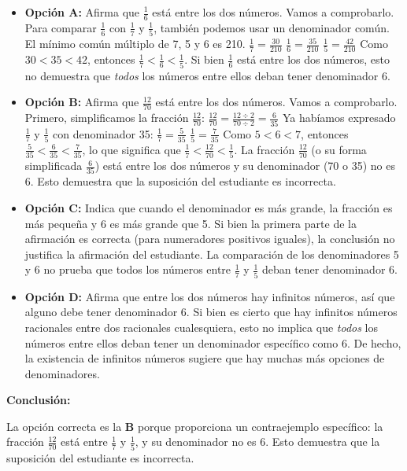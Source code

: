 \documentclass[
]{article}
\begin{document}
\begin{itemize}
\item
  \textbf{Opción A:} Afirma que \(\frac{1}{6}\) está entre los dos
  números. Vamos a comprobarlo. Para comparar \(\frac{1}{6}\) con
  \(\frac{1}{7}\) y \(\frac{1}{5}\), también podemos usar un denominador
  común. El mínimo común múltiplo de 7, 5 y 6 es 210.
  \(\frac{1}{7} = \frac{30}{210}\) \(\frac{1}{6} = \frac{35}{210}\)
  \(\frac{1}{5} = \frac{42}{210}\) Como \(30 < 35 < 42\), entonces
  \(\frac{1}{7} < \frac{1}{6} < \frac{1}{5}\). Si bien \(\frac{1}{6}\)
  está entre los dos números, esto no demuestra que \emph{todos} los
  números entre ellos deban tener denominador 6.
\item
  \textbf{Opción B:} Afirma que \(\frac{12}{70}\) está entre los dos
  números. Vamos a comprobarlo. Primero, simplificamos la fracción
  \(\frac{12}{70}\):
  \(\frac{12}{70} = \frac{12 \div 2}{70 \div 2} = \frac{6}{35}\) Ya
  habíamos expresado \(\frac{1}{7}\) y \(\frac{1}{5}\) con denominador
  35: \(\frac{1}{7} = \frac{5}{35}\) \(\frac{1}{5} = \frac{7}{35}\) Como
  \(5 < 6 < 7\), entonces
  \(\frac{5}{35} < \frac{6}{35} < \frac{7}{35}\), lo que significa que
  \(\frac{1}{7} < \frac{12}{70} < \frac{1}{5}\). La fracción
  \(\frac{12}{70}\) (o su forma simplificada \(\frac{6}{35}\)) está
  entre los dos números y su denominador (70 o 35) no es 6. Esto
  demuestra que la suposición del estudiante es incorrecta.
\item
  \textbf{Opción C:} Indica que cuando el denominador es más grande, la
  fracción es más pequeña y 6 es más grande que 5. Si bien la primera
  parte de la afirmación es correcta (para numeradores positivos
  iguales), la conclusión no justifica la afirmación del estudiante. La
  comparación de los denominadores 5 y 6 no prueba que todos los números
  entre \(\frac{1}{7}\) y \(\frac{1}{5}\) deban tener denominador 6.
\item
  \textbf{Opción D:} Afirma que entre los dos números hay infinitos
  números, así que alguno debe tener denominador 6. Si bien es cierto
  que hay infinitos números racionales entre dos racionales
  cualesquiera, esto no implica que \emph{todos} los números entre ellos
  deban tener un denominador específico como 6. De hecho, la existencia
  de infinitos números sugiere que hay muchas más opciones de
  denominadores.
\end{itemize}

\textbf{Conclusión:}

La opción correcta es la \textbf{B} porque proporciona un contraejemplo
específico: la fracción \(\frac{12}{70}\) está entre \(\frac{1}{7}\) y
\(\frac{1}{5}\), y su denominador no es 6. Esto demuestra que la
suposición del estudiante es incorrecta.
\end{document}
